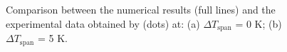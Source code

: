 \documentclass[review,preprint,12pt]{elsarticle}
\begin{document}
\begin{figure}[htp]
\centering
{}\\
\\
\caption{Comparison between the numerical results (full lines) and the experimental data obtained by \cite{Nakashima2017} (dots) at: (a) $\Delta T_\textrm{span}$ = 0 K; (b) $\Delta T_\textrm{span}$ = 5 K.}
\label{fig:Alan}
\end{figure}
\end{document}
